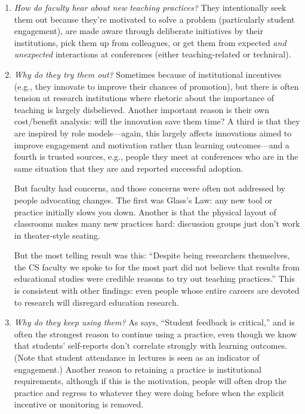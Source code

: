 \begin{enumerate}
\item
  \emph{How do faculty hear about new teaching practices?} They
  intentionally seek them out because they're motivated to solve a
  problem (particularly student engagement), are made aware through
  deliberate initiatives by their institutions, pick them up from
  colleagues, or get them from expected \emph{and unexpected} interactions
  at conferences (either teaching-related or technical).
\item
  \emph{Why do they try them out?} Sometimes because of institutional
  incentives (e.g., they innovate to improve their chances of
  promotion), but there is often tension at research institutions
  where rhetoric about the importance of teaching is largely
  disbelieved. Another important reason is their own cost/benefit
  analysis: will the innovation save them time? A third is that they
  are inspired by role models---again, this largely affects innovations
  aimed to improve engagement and motivation rather than learning
  outcomes---and a fourth is trusted sources, e.g., people they meet at
  conferences who are in the same situation that they are and reported
  successful adoption.

  But faculty had concerns, and those concerns were often not
  addressed by people advocating changes. The first was Glass's Law:
  any new tool or practice initially slows you down. Another is that
  the physical layout of classrooms makes many new practices hard:
  discussion groups just don't work in theater-style seating.

  But the most telling result was this: ``Despite being researchers
  themselves, the CS faculty we spoke to for the most part did not
  believe that results from educational studies were credible reasons
  to try out teaching practices.'' This is consistent with other
  findings: even people whose entire careers are devoted to research
  will disregard education research.
\item
  \emph{Why do they keep using them?} As \cite{Bark2015} says, ``Student
  feedback is critical,'' and is often the strongest reason to continue
  using a practice, even though we know that students' self-reports
  don't correlate strongly with learning outcomes. (Note that student
  attendance in lectures is seen as an indicator of engagement.)
  Another reason to retaining a practice is institutional
  requirements, although if this is the motivation, people will often
  drop the practice and regress to whatever they were doing before
  when the explicit incentive or monitoring is removed.
\end{enumerate}

